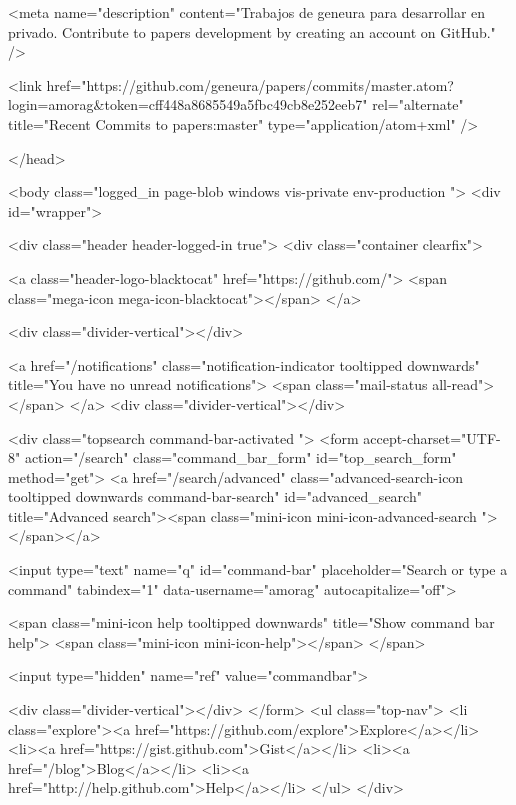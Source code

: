     <meta name="description" content="Trabajos de geneura para desarrollar en privado. Contribute to papers development by creating an account on GitHub." />

  <link href="https://github.com/geneura/papers/commits/master.atom?login=amorag&token=cff448a8685549a5fbc49cb8e252eeb7" rel="alternate" title="Recent Commits to papers:master" type="application/atom+xml" />

  </head>


  <body class="logged_in page-blob windows vis-private env-production  ">
    <div id="wrapper">

      

      

      

      


        <div class="header header-logged-in true">
          <div class="container clearfix">

            <a class="header-logo-blacktocat" href="https://github.com/">
  <span class="mega-icon mega-icon-blacktocat"></span>
</a>

            <div class="divider-vertical"></div>

              <a href="/notifications" class="notification-indicator tooltipped downwards" title="You have no unread notifications">
    <span class="mail-status all-read"></span>
  </a>
  <div class="divider-vertical"></div>


              <div class="topsearch command-bar-activated ">
      <form accept-charset="UTF-8" action="/search" class="command_bar_form" id="top_search_form" method="get">
  <a href="/search/advanced" class="advanced-search-icon tooltipped downwards command-bar-search" id="advanced_search" title="Advanced search"><span class="mini-icon mini-icon-advanced-search "></span></a>

  <input type="text" name="q" id="command-bar" placeholder="Search or type a command" tabindex="1" data-username="amorag" autocapitalize="off">

  <span class="mini-icon help tooltipped downwards" title="Show command bar help">
    <span class="mini-icon mini-icon-help"></span>
  </span>

  <input type="hidden" name="ref" value="commandbar">

  <div class="divider-vertical"></div>
</form>
  <ul class="top-nav">
      <li class="explore"><a href="https://github.com/explore">Explore</a></li>
      <li><a href="https://gist.github.com">Gist</a></li>
      <li><a href="/blog">Blog</a></li>
    <li><a href="http://help.github.com">Help</a></li>
  </ul>
</div>


